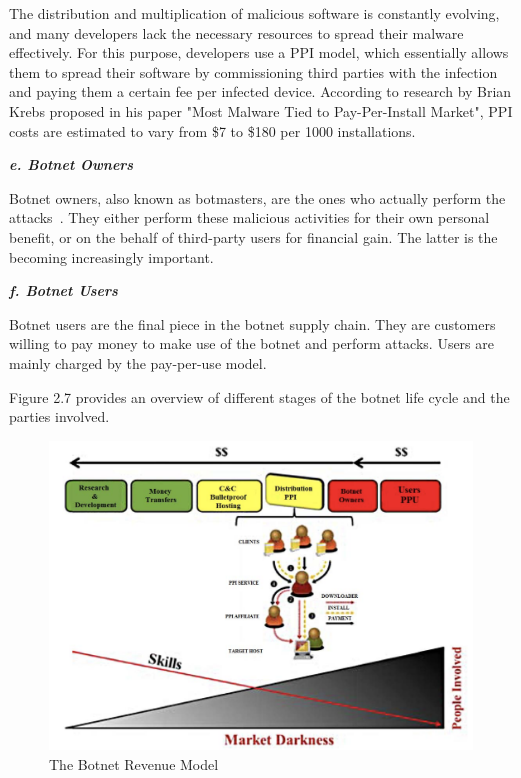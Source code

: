 The distribution and multiplication of malicious software is constantly evolving, and many developers lack the necessary resources to spread their malware effectively.
For this purpose, developers use a PPI model, which essentially allows them to spread their software by commissioning third parties with the infection and paying them a certain fee per infected device.
According to research by Brian Krebs proposed in his paper "Most Malware Tied to Pay-Per-Install Market", PPI costs are estimated to vary from \$7 to \$180 per 1000 installations.\cite{Putman,Bottazzi14}

\textbf{\textit{e. Botnet Owners}}

Botnet owners, also known as botmasters, are the ones who actually perform the attacks~\cite{Putman,Bottazzi14}.
They either perform these malicious activities for their own personal benefit, or on the behalf of third-party users for financial gain.
The latter is the becoming increasingly important.\cite{Li09}

\textbf{\textit{f. Botnet Users}}

Botnet users are the final piece in the botnet supply chain.
They are customers willing to pay money to make use of the botnet and perform attacks.
Users are mainly charged by the pay-per-use model.\cite{Putman,Bottazzi14}

Figure 2.7 provides an overview of different stages of the botnet life cycle and the parties involved. 


\begin{figure}[ht]
\begin{center} \includegraphics[scale=0.6]{Talk11/RevenueModel} \end{center}
\caption{The Botnet Revenue Model~\cite{Bottazzi14}}
\label{RevenueModel}
\end{figure}

